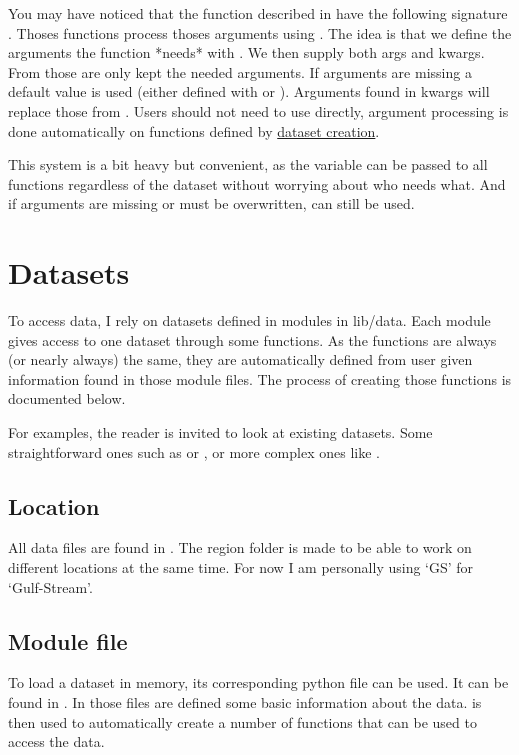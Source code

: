 You may have noticed that the function described in  have the following signature .
Thoses functions process thoses arguments using .
The idea is that we define the arguments the function *needs* with .
We then supply both args and kwargs. From those are only kept the needed arguments.
If arguments are missing a default value is used (either defined with  or ).
Arguments found in kwargs will replace those from .
Users should not need to use  directly, argument processing is done automatically on functions defined by \hyperref[sec:org-datasets]{dataset creation}.

This system is a bit heavy but convenient, as the variable  can be passed to all functions regardless of the dataset without worrying about who needs what. And if arguments are missing or must be overwritten,  can still be used.

\section{Datasets}
\label{sec:org-datasets}

To access data, I rely on datasets defined in modules in lib/data.
Each module gives access to one dataset through some functions.
As the functions are always (or nearly always) the same, they are automatically defined from user given information found in those module files. The process of creating those functions is documented below.

For examples, the reader is invited to look at existing datasets.
Some straightforward ones such as  or , or more complex ones like .

\subsection{Location}
All data files are found in .
The region folder is made to be able to work on different locations at the same time.
For now I am personally using `GS' for `Gulf-Stream'.

\subsection{Module file}
To load a dataset in memory, its corresponding python file can be used. It can be found in .
In those files are defined some basic information about the data.
 is then used to automatically create a number of functions that can be used to access the data.
